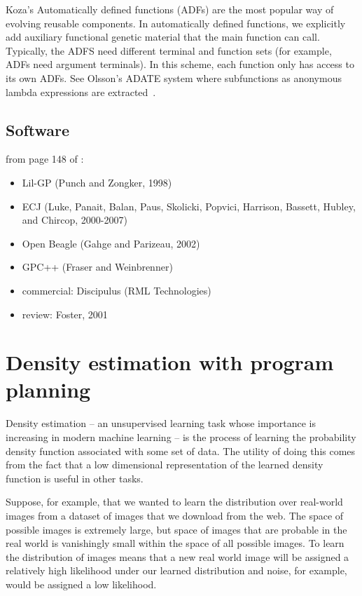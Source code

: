 \documentclass{article}
\begin{document}
Koza's Automatically defined functions (ADFs) are the most popular way of
evolving reusable components. In automatically defined functions, we explicitly
add auxiliary functional genetic material that the main function can call.
Typically, the ADFS need different terminal and function sets (for example,
ADFs need argument terminals). In this scheme, each function only has access to
its own ADFs. See Olsson's ADATE system where subfunctions as anonymous lambda
expressions are extracted~\cite{DBLP:conf/eurogp/Olsson9}.

\subsection{Software}
from page 148 of \cite{poli08:fieldguide}:
\begin{itemize}
\item Lil-GP (Punch and Zongker, 1998)
\item ECJ (Luke, Panait, Balan, Paus, Skolicki, Popvici, Harrison, Bassett,
Hubley, and Chircop, 2000-2007)
\item Open Beagle (Gahge and Parizeau, 2002)
\item GPC++ (Fraser and Weinbrenner)
\item commercial: Discipulus (RML Technologies)
\item review: Foster, 2001 
\end{itemize}




\section{Density estimation with program planning} 
Density estimation -- an unsupervised learning task whose importance is
increasing in modern machine learning -- is the process of learning the
probability density function associated with some set of data. The utility of
doing this comes from the fact that a low dimensional representation of the
learned density function is useful in other tasks.

Suppose, for example, that we wanted to learn the distribution over real-world
images from a dataset of images that we download from the web. The space of
possible images is extremely large, but space of images that are probable in
the real world is vanishingly small within the space of all possible images. To
learn the distribution of images means that a new real world image will be
assigned a relatively high likelihood under our learned distribution and noise,
for example, would be assigned a low likelihood.
\end{document}
